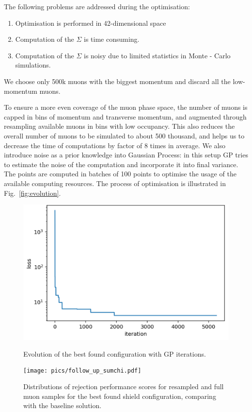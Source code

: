 \documentclass[a4paper]{jpconf}
\theoremstyle{my_theorem_style}
\numberwithin{equation}{section}
\begin{document}
The following problems are addressed during the optimisation:
\begin{enumerate}
\item Optimisation is performed in 42-dimensional space
\item Computation of the $\Sigma$ is time consuming.
\item Computation of the $\Sigma$ is noisy due to limited statistics
  in Monte - Carlo simulations.
\end{enumerate}

We choose only 500k muons with the biggest momentum and discard
all the low-momentum muons. 

To ensure a more even coverage of the muon phase space, the number of
muons is capped in bins of momentum and transverse momentum, and
augmented through resampling available muons in bins with low
occupancy. This also reduces the overall number of muons to be
simulated to about 500 thousand, and helps us to decrease the time of
computations by factor of  8 times in average. We also introduce noise
as a prior knowledge into Gaussian Process: in this setup GP tries to
estimate the noise of the computation and incorporate it into final
variance. The points are computed in batches of 100 points to optimise
the usage of the available computing resources. The process of
optimisation is illustrated in Fig.~\ref{fig:evolution}.

\begin{figure}[H]
\centering
\begin{minipage}[c]{0.45\textwidth}
\includegraphics[width=0.9\linewidth]{pics/opt}
 \caption{\label{fig:evolution}Evolution of the best found
   configuration with GP iterations.}
 \end{minipage}
\begin{minipage}[c]{0.45\textwidth}
  \texttt{[image: pics/follow\_up\_sumchi.pdf]}
  \caption{\label{fig:scores} Distributions of rejection performance
    scores for resampled and full muon samples for the best found
    shield configuration, comparing with the baseline solution.}
\end{minipage}  
\end{figure}
\end{document}
